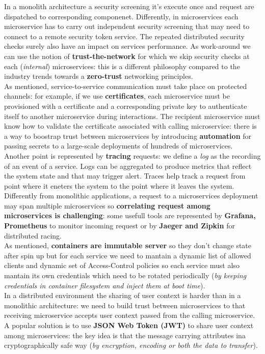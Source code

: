 \documentclass[10pt,a4paper]{report}
\begin{document}
In a monolith architecture a security screening it's execute once and request are dispatched to corresponding componenet. Differently, in microservices each microservice has to carry out independent security screening that may need to connect to a remote security token service. The repeated distributed security checks surely also have an impact on services performance. As work-around we can use the notion of \textbf{trust-the-network} for which we skip security checks at each (\textit{internal}) microservices: this is a different philosophy compared to the industry trends towards a \textbf{zero-trust} networking principles. \\
As mentioned, service-to-service communication must take place on protected channels: for example, if we use \textbf{certificates}, each microservice must be provisioned with a certificate and a corresponding private key to authenticate itself to another microservice during interactions. The recipient microservice must know how to validate the certificate associated with calling microservice: there is a way to boostrap trust between microservices by introducing \textbf{automation} for passing secrets to a large-scale deployments of hundreds of microservices.\\
Another point is represented by \textbf{tracing} requests: we define a \textit{log} as the recording of an event of a service. Logs can be aggregated to produce metrics that reflect the system state and that may trigger alert. Traces help track a request from point where it eneters the system to the point where it leaves the system. Differently from monolithic applications, a request to a microservices deployment may span multiple microservices so \textbf{correlating request among microservices is challenging}: some usefull tools are represented by \textbf{Grafana, Prometheus} to monitor incoming request or by \textbf{Jaeger and Zipkin} for distributed racing. \\
As mentioned, \textbf{containers are immutable server} so they don't change state after spin up but for each service we need to mantain a dynamic list of allowed clients and dynamic set of Access-Control policies so each service must also mantain its own credentials which need to be rotated periodically (\textit{by keeping credentials in container filesystem and inject them at boot time}). \\
In a distributed environment the sharing of user context is harder than in a monolithic architecture: we need to build trust between microservices to that receiving microservice accepts user context passed from the calling microservice. A popular solution is to use \textbf{JSON Web Token (JWT)} to share user context among microservices: the key idea is that the message carrying attributes ina cryptographically safe way (\textit{by encryption, encoding or both the data to transfer}).
\end{document}
